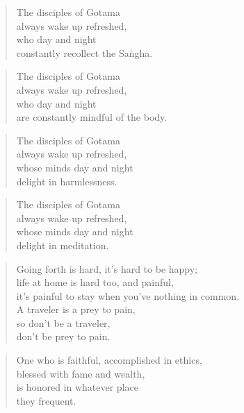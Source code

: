 \documentclass[12pt,openany]{book}%
\begin{document}
\begin{verse}%
The disciples of Gotama \\
always wake up refreshed, \\
who day and night \\
constantly recollect the \textsanskrit{Saṅgha}. 

%
\end{verse}

\begin{verse}%
The disciples of Gotama \\
always wake up refreshed, \\
who day and night \\
are constantly mindful of the body. 

%
\end{verse}

\begin{verse}%
The disciples of Gotama \\
always wake up refreshed, \\
whose minds day and night \\
delight in harmlessness. 

%
\end{verse}

\begin{verse}%
The disciples of Gotama \\
always wake up refreshed, \\
whose minds day and night \\
delight in meditation. 

%
\end{verse}

\begin{verse}%
Going forth is hard, it’s hard to be happy; \\
life at home is hard too, and painful, \\
it’s painful to stay when you’ve nothing in common. \\
A traveler is a prey to pain, \\
so don’t be a traveler, \\
don’t be prey to pain. 

%
\end{verse}

\begin{verse}%
One who is faithful, accomplished in ethics, \\
blessed with fame and wealth, \\
is honored in whatever place \\
they frequent. 

%
\end{verse}
\end{document}
